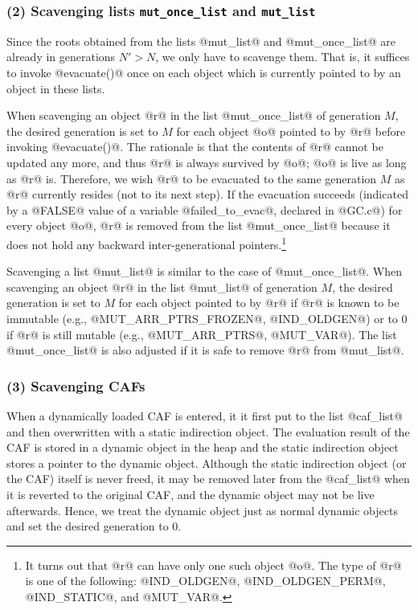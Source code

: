 \documentclass{article}
\begin{document}
\subsubsection{(2) Scavenging lists {\tt mut\_once\_list} and {\tt mut\_list}}

Since the roots obtained from the lists @mut_list@ and @mut_once_list@ are
already in generations $N' > N$, we only have to scavenge them.
That is, it suffices to invoke @evacuate()@ once on each object 
which is currently pointed to by an object in these lists. 

When scavenging an object @r@ in the list @mut_once_list@ of generation $M$,
the desired generation is set to $M$ for each object @o@ pointed
to by @r@ before invoking @evacuate()@. 
The rationale is that the contents of @r@ cannot be updated any more,
and thus @r@ is always survived by @o@; @o@ is live as long as @r@ is.
Therefore, we wish @r@ to be evacuated to the same generation $M$ as @r@
currently resides (not to its next step).
If the evacuation succeeds (indicated by a @FALSE@ value of a variable
@failed_to_evac@, declared in @GC.c@) for every object @o@, @r@ is removed 
from the list @mut_once_list@ because it does not hold any backward 
inter-generational pointers.\footnote{It turns out that @r@ can have only
one such object @o@. The type of @r@ is one of the following:
@IND\_OLDGEN@, @IND\_OLDGEN\_PERM@, @IND\_STATIC@, and @MUT\_VAR@.}

Scavenging a list @mut_list@ is similar to the case of @mut_once_list@.
When scavenging an object @r@ in the list @mut_list@ of generation $M$,
the desired generation is set to $M$ for each object pointed to by @r@
if @r@ is known to be immutable (e.g., @MUT_ARR_PTRS_FROZEN@, 
@IND_OLDGEN@)
or to $0$ if @r@ is still mutable (e.g., @MUT_ARR_PTRS@, @MUT_VAR@).
The list @mut_once_list@ is also adjusted if it is safe to remove @r@ from
@mut_list@. 

\subsubsection{(3) Scavenging CAFs}

When a dynamically loaded CAF is entered, it it first put to the list 
@caf_list@ and then overwritten with a static indirection object.
The evaluation result of the CAF is stored in a dynamic object in the heap
and the static indirection object stores a pointer to the dynamic object.
Although the static indirection object (or the CAF) itself is never freed, 
it may be removed later from the @caf_list@ when it is reverted to the 
original CAF, and the dynamic object may not be live afterwards.
Hence, we treat the dynamic object just as normal dynamic objects and
set the desired generation to $0$.
\end{document}

